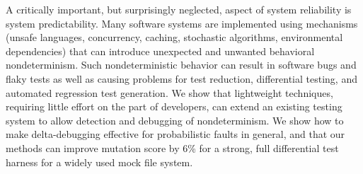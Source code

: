 A critically important, but surprisingly neglected, aspect of system reliability is system predictability.  Many software systems are implemented using mechanisms (unsafe languages, concurrency, caching, stochastic algorithms, environmental dependencies) that can introduce unexpected and unwanted behavioral nondeterminism.  Such nondeterministic behavior can result in software bugs and flaky tests as well as causing problems for test reduction, differential testing, and automated regression test generation.  We show that lightweight techniques, requiring little effort on the part of developers, can extend an existing testing system to allow detection and debugging of nondeterminism.  We show how to make delta-debugging effective for probabilistic faults in general, and that our methods can improve mutation score by 6\% for a strong, full differential test harness for a widely used mock file system.